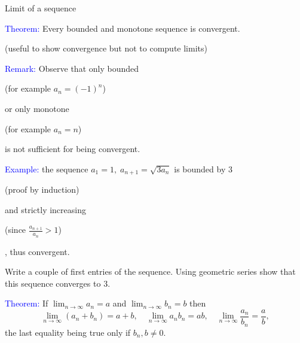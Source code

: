 \documentclass[11pt,aspectratio=169]{beamer}
\begin{document}
\begin{frame}{Limit of a sequence}

\textcolor{blue}{Theorem:} Every bounded and monotone sequence is convergent. \\\begin{tiny} (useful to show convergence but not to compute limits) \end{tiny}
\vskip 12pt
\textcolor{blue}{Remark:} Observe that only bounded  \begin{tiny}(for example $a_n=(-1)^n$)\end{tiny} or only monotone  \begin{tiny}(for example $a_n=n$)\end{tiny} is not sufficient for being convergent.

\vskip 12pt

\textcolor{blue}{Example:} the sequence $a_1=1, \; a_{n+1}=\sqrt{3a_n}$ is bounded by $3$ \begin{tiny} (proof by induction) \end{tiny} and strictly increasing \begin{tiny} (since $\frac{a_{n+1}}{a_n}>1$)\end{tiny}, thus convergent.

\begin{tiny}Write a couple of first entries of the sequence. Using geometric series show that this sequence converges to $3$.  \end{tiny}
\vskip 12pt

\textcolor{blue}{Theorem:} If $\lim_{n \rightarrow \infty} a_n=a$ and $\lim_{n \rightarrow \infty} b_n=b$
then $$\lim_{n \rightarrow \infty} (a_n+b_n)=a+b, \quad\lim_{n \rightarrow \infty} a_nb_n=ab,
\quad\lim_{n \rightarrow \infty} \frac{a_n}{b_n}=\frac{a}{b},$$
the last equality being true only if $b_n,b\neq0$.
 \end{frame}
\end{document}
